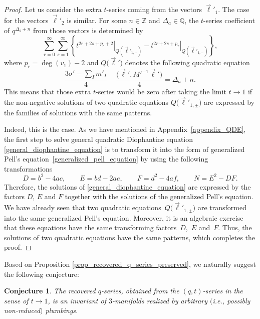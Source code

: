 \documentclass[pdftex]{sigma}
\numberwithin{equation}{section}
\newtheorem{Conjecture}[Theorem]{Conjecture}
 { \theoremstyle{definition}
\newtheorem{Definition}[Theorem]{Definition}
\newtheorem{Note}[Theorem]{Note}
\newtheorem{Example}[Theorem]{Example}
\newtheorem{Remark}[Theorem]{Remark} }
\begin{document}
\begin{proof}
	Let us consider the extra $ t $-series coming from the vectors $ \vec{\ell}'_1 $. The case for the vectors $ \vec{\ell}'_2 $ is similar. For some $ n\in \mathbb{Z} $ and $ \Delta_a\in \mathbb{Q} $, the $ t $-series coefficient of $ q^{\Delta_a+n} $ from those vectors is determined by
	\[
	\sum_{r=0}^{\infty}\sum_{s=1}^{\infty}\left\{\left.t^{2r+2s+p_r+2}\right|_{Q(\vec{\ell}'_{1,+})}-\left.t^{2r+2s+p_r}\right|_{Q(\vec{\ell}'_{1,-})}\right\},
	\]
	where $ p_r=\deg(v_1)-2 $ and $ Q\big(\vec{\ell}'\big) $ denotes the following quadratic equation
	\[
	\frac{3\sigma'-\sum_I m'_I}{4}-\frac{\big(\vec{\ell}',{M'}^{-1}\vec{\ell}'\big)}{4}=\Delta_a+n.
	\]
	This means that those extra $ t $-series would be zero after taking the limit $ t\rightarrow 1 $ if the non-negative solutions of two quadratic equations $ Q\big(\vec{\ell}'_{1,\pm}\big) $ are expressed by the families of solutions with the same patterns.
	
	Indeed, this is the case. As we have mentioned in Appendix~\ref{appendix_QDE}, the first step to solve general quadratic Diophantine equation \eqref{general_diophantine_equation} is to transform it into the form of generalized Pell's equation~\eqref{generalized_pell_equation} by using the following transformations
	\[
	D=b^2-4ac,\qquad E=bd-2ae,\qquad F=d^2-4af,\qquad N=E^2-DF.
	\]
	Therefore, the solutions of \eqref{general_diophantine_equation} are expressed by the factors $ D$, $E $ and $ F $ together with the solutions of the generalized Pell's equation. We have already seen that two quadratic equations~$ Q\big(\vec{\ell}'_{1,\pm}\big) $ are transformed into the same generalized Pell's equation. Moreover, it is an algebraic exercise that these equations have the same transforming factors~$ D$,~$E $ and~$ F $. Thus, the solutions of two quadratic equations have the same patterns, which completes the proof.
\end{proof}

Based on Proposition \ref{prop_recovered_q_series_preserved}, we naturally suggest the following conjecture:

\begin{Conjecture}\label{conjecture}
The recovered $ q $-series, obtained from the $ (q,t) $-series in the sense of $ t\rightarrow 1 $, is an invariant of $3$-manifolds realized by arbitrary $($i.e., possibly non-reduced$)$ plumbings.
\end{Conjecture}
\end{document}
